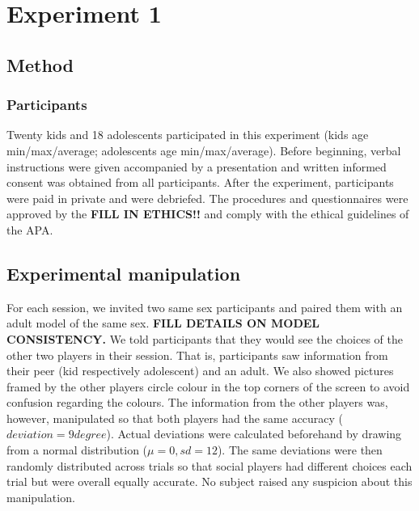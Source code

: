 \documentclass[man]{apa}
\begin{document}
\section{Experiment 1}
\subsection{Method}
\subsubsection{Participants}
Twenty kids and 18 adolescents participated in this experiment (kids age min/max/average; adolescents age min/max/average). Before beginning, verbal instructions were given accompanied by a presentation and written informed consent was obtained from all participants. After the experiment, participants were paid in private and were debriefed. The procedures and questionnaires were approved by the \textbf{FILL IN ETHICS!!} and comply with the ethical guidelines of the APA.
\subsection{Experimental manipulation}
For each session, we invited two same sex participants and paired them with an adult model of the same sex. \textbf{FILL DETAILS ON MODEL CONSISTENCY.} We told participants that they would see the choices of the other two players in their session. That is, participants saw information from their peer (kid respectively adolescent) and an adult. We also showed pictures framed by the other players circle colour in the top corners of the screen to avoid confusion regarding the colours. The information from the other players was, however, manipulated so that both players had the same accuracy ($deviation=9 degree$). Actual deviations were calculated beforehand by drawing from a normal distribution ($\mu=0, sd=12$). The same deviations were then randomly distributed across trials so that social players had different choices each trial but were overall equally accurate. No subject raised any suspicion about this manipulation.

\begin{figure}
\end{figure}
\end{document}
